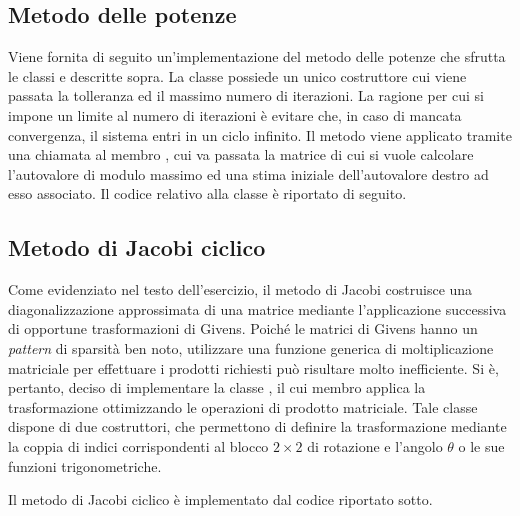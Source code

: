 \subsection*{Metodo delle potenze}
Viene fornita di seguito un'implementazione del metodo delle potenze
che sfrutta le classi  e  descritte sopra. La
classe  possiede un unico
costruttore cui viene passata la tolleranza ed il massimo numero di
iterazioni. La ragione per cui si impone un limite al numero di
iterazioni \`e evitare che, in caso di mancata convergenza, il sistema
entri in un ciclo infinito. Il metodo viene applicato tramite una
chiamata al membro , cui va passata la matrice di cui si
vuole calcolare l'autovalore di modulo massimo ed una stima iniziale
dell'autovalore destro ad esso associato. Il codice relativo alla
classe  \`e riportato di seguito.
%
\lstset{basicstyle=\scriptsize\sf}


\lstset{basicstyle=\sf}

\subsection*{Metodo di Jacobi ciclico}
Come evidenziato nel testo dell'esercizio, il metodo di Jacobi
costruisce una diagonalizzazione approssimata di una matrice mediante
l'applicazione successiva di opportune trasformazioni di
Givens. Poich\'e le matrici di Givens hanno un \emph{pattern} di
sparsit\`a ben noto, utilizzare una funzione generica di
moltiplicazione matriciale per effettuare i prodotti richiesti pu\`o
risultare molto inefficiente. Si \`e, pertanto, deciso di implementare
la classe , il cui membro
 applica la trasformazione ottimizzando le operazioni di
prodotto matriciale. Tale classe dispone di due costruttori, che
permettono di definire la trasformazione mediante la coppia di indici
corrispondenti al blocco $2\times 2$ di rotazione e l'angolo $\theta$
o le sue funzioni trigonometriche.
%
\lstset{basicstyle=\scriptsize\sf}


\lstset{basicstyle=\sf}
%
Il metodo di Jacobi ciclico \`e implementato dal codice riportato sotto.
%
\lstset{basicstyle=\scriptsize\sf}


\lstset{basicstyle=\sf}

